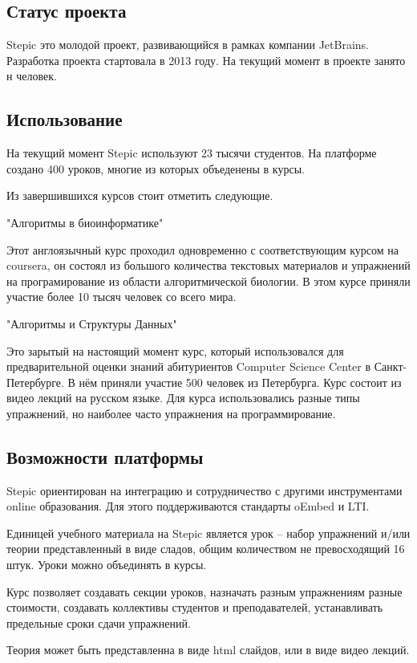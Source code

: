 \documentclass{matmex-diploma-custom}
\begin{document}
\subsection*{Статус проекта}
Stepic это молодой проект, развивающийся в рамках компании
JetBrains. Разработка проекта стартовала в 2013 году. На текущий
момент в проекте занято н человек.

\subsection*{Использование}
На текущий момент Stepic используют 23 тысячи студентов. На платформе
создано 400 уроков, многие из которых объеденены в курсы.

Из завершившихся курсов стоит отметить следующие.

"Алгоритмы в биоинформатике"

Этот англоязычный курс проходил одновременно с соответствующим курсом
на coursera, он состоял из большого количества текстовых материалов и
упражнений на програмирование из области алгоритмической биологии. В
этом курсе приняли участие более 10 тысяч человек со всего мира.

"Алгоритмы и Структуры Данных"

Это зарытый на настоящий момент курс, который использовался для
предварительной оценки знаний абитуриентов Computer Science Center в
Санкт-Петербурге. В нём приняли участие 500 человек из
Петербурга. Курс состоит из видео лекций на русском языке. Для курса
использовались разные типы упражнений, но наиболее часто упражнения на
программирование.

\subsection*{Возможности платформы}
Stepic ориентирован на интеграцию и сотрудничество с другими инструментами
online образования. Для этого поддерживаются стандарты oEmbed и LTI.

Единицей учебного материала на Stepic является урок -- набор упражнений
и/или теории представленный в виде сладов, общим количеством не
превосходящий 16 штук. Уроки можно объединять в курсы.

Курс позволяет создавать секции уроков, назначать разным упражнениям
разные стоимости, создавать коллективы студентов и преподавателей,
устанавливать предельные сроки сдачи упражнений.

Теория может быть представленна в виде html слайдов, или в виде видео
лекций.
\end{document}
